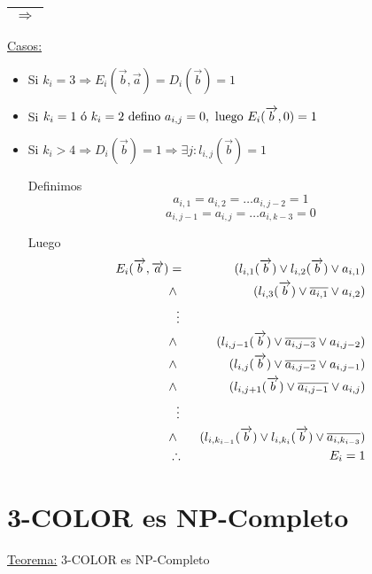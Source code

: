 \documentclass[12pt,a4paper]{report}
\begin{document}
		\vspace{5mm}
		\begin{tabular}{|c|} \hline $\Rightarrow$ \\ \hline \end{tabular}

			\underline{Casos:}
			\begin{itemize}
				\item Si $k_{i} = 3 \Rightarrow E_{i}(\overrightarrow{b}, \overrightarrow{a}) = D_{i}(\overrightarrow{b}) = 1$
				\item Si $k_{i} = 1 \textup{ ó } k_{i} = 2 \textup{ defino } a_{i, j} = 0, \textup{ luego } E_{i}(\overrightarrow{b}, 0) = 1$
				\item Si $k_{i} > 4 \Rightarrow D_{i}(\overrightarrow{b}) = 1 \Rightarrow \exists j : l_{i, j}(\overrightarrow{b}) = 1$

					Definimos
						\[ a_{i, 1} = a_{i, 2} = \dotsc a_{i, j-2} = 1 \]
						\[ a_{i, j-1} = a_{i, j} = \dotsc a_{i, k-3} = 0 \]

					Luego
					\begin{eqnarray}
						\nonumber E_{i}(\overrightarrow{b}, \overrightarrow{a}) &=& (l_{i, 1}(\overrightarrow{b}) \vee l_{i, 2}(\overrightarrow{b}) \vee a_{i, 1}) \\
						\nonumber &\wedge & (l_{i, 3}(\overrightarrow{b}) \vee \overline{a_{i, 1}} \vee a_{i, 2}) \\
						\nonumber &\vdotswithin{\ldots}& \\
						\nonumber &\wedge & (l_{i, j-1}(\overrightarrow{b}) \vee \overline{a_{i, j-3}} \vee a_{i, j-2}) \\
						\nonumber &\wedge & (l_{i, j}(\overrightarrow{b}) \vee \overline{a_{i, j-2}} \vee a_{i, j-1}) \\
						\nonumber &\wedge & (l_{i, j+1}(\overrightarrow{b}) \vee \overline{a_{i, j-1}} \vee a_{i, j}) \\
						\nonumber &\vdotswithin{\ldots}& \\
						\nonumber &\wedge & (l_{i, k_{i-1}}(\overrightarrow{b}) \vee l_{i, k_{i}}(\overrightarrow{b}) \vee \overline{a_{i, k_{i-3}}}) \\
						\nonumber &\therefore & E_{i} = 1
					\end{eqnarray}
			\end{itemize}

	\section{3-COLOR es NP-Completo}
		\underline{Teorema:} 3-COLOR es NP-Completo
\end{document}
